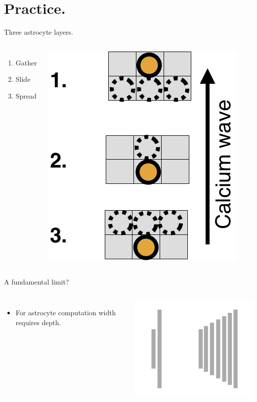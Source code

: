 \documentclass[10pt]{beamer}
\begin{document}
\section[In practice.]{Practice.}
\begin{frame}[fragile]{Three astrocyte layers.}
\begin{columns}
\begin{enumerate}
    \item Gather
    \item Slide
    \item Spread
\end{enumerate}
\centering
\includegraphics[scale=0.25]{images/layers.png} 
\end{columns}
\end{frame}

\begin{frame}[fragile]{A fundamental limit?}
\begin{columns}
\begin{itemize}
    \item For astrocyte computation \alert{width requires depth}.
\end{itemize}
\centering
\includegraphics[scale=0.5]{images/glaidim.png} 
\end{columns}
\end{frame}
\end{document}
